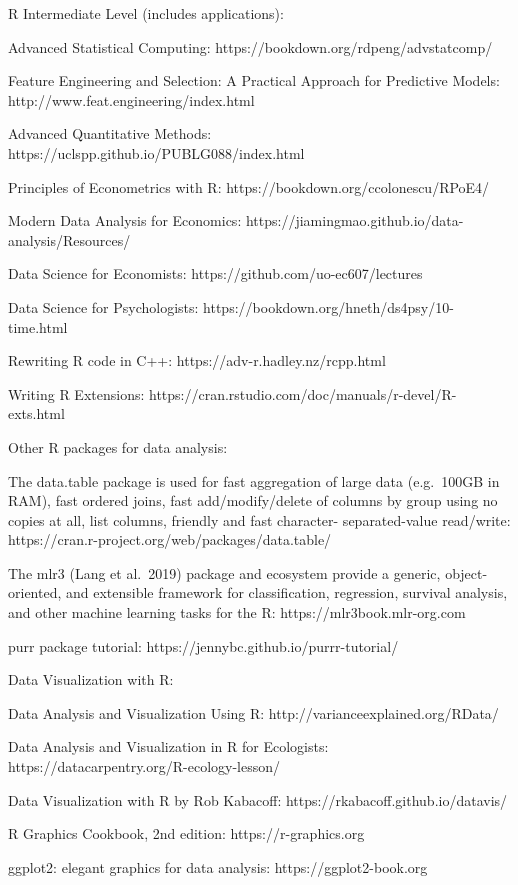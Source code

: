 \documentclass[
  letterpaper,
  DIV=11,
  numbers=noendperiod]{scrreport}
\begin{document}
R Intermediate Level (includes applications):

Advanced Statistical Computing: https://bookdown.org/rdpeng/advstatcomp/

Feature Engineering and Selection: A Practical Approach for Predictive
Models: http://www.feat.engineering/index.html

Advanced Quantitative Methods:
https://uclspp.github.io/PUBLG088/index.html

Principles of Econometrics with R:
https://bookdown.org/ccolonescu/RPoE4/

Modern Data Analysis for Economics:
https://jiamingmao.github.io/data-analysis/Resources/

Data Science for Economists: https://github.com/uo-ec607/lectures

Data Science for Psychologists:
https://bookdown.org/hneth/ds4psy/10-time.html

Rewriting R code in C++: https://adv-r.hadley.nz/rcpp.html

Writing R Extensions:
https://cran.rstudio.com/doc/manuals/r-devel/R-exts.html

Other R packages for data analysis:

The data.table package is used for fast aggregation of large data
(e.g.~100GB in RAM), fast ordered joins, fast add/modify/delete of
columns by group using no copies at all, list columns, friendly and fast
character- separated-value read/write:
https://cran.r-project.org/web/packages/data.table/

The mlr3 (Lang et al.~2019) package and ecosystem provide a generic,
object-oriented, and extensible framework for classification,
regression, survival analysis, and other machine learning tasks for the
R: https://mlr3book.mlr-org.com

purr package tutorial: https://jennybc.github.io/purrr-tutorial/

Data Visualization with R:

Data Analysis and Visualization Using R:
http://varianceexplained.org/RData/

Data Analysis and Visualization in R for Ecologists:
https://datacarpentry.org/R-ecology-lesson/

Data Visualization with R by Rob Kabacoff:
https://rkabacoff.github.io/datavis/

R Graphics Cookbook, 2nd edition: https://r-graphics.org

ggplot2: elegant graphics for data analysis: https://ggplot2-book.org
\end{document}
